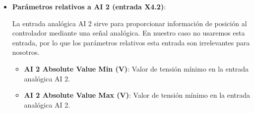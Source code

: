 \documentclass[english,spanish,a4paper,11pt]{article}
\begin{document}
\begin{itemize}
    \begin{itemize}
        \item $f_{\text{ZV}}(\cdot)$, correspondiente al parámetro «AI 1 Dead Band Zero Value» y mostrada en la \cref{fig:deadband_zv}.
        \item $f_{\text{IS}}(\cdot)$, correspondiente al parámetro «AI 1 Dead Band Input Signal» y mostrada en la \cref{fig:deadband_is}.
    \end{itemize}
    
    de forma que para el valor analógico de entrada $x$ la posición o velocidad objetivo será:
    
    \begin{equation}
        y = (f_{\text{ZV}} \circ f_{\text{IS}})(x) = f_{\text{ZV}}(f_{\text{IS}}(x))
    \end{equation}

    \begin{admonition}{Nota}
        El cálculo de la posición o velocidad objetivo no está especificado en el manual del controlador (considerando la versión del manual 3.0.1, la más reciente a fecha de este documento) y se ha obtenido experimentalmente. El manual solo describe los parámetros «AI 1 Dead Band Zero Value» y «AI 1 Dead Band Input Signal» de manera textual, de forma similar a como se han descrito más arriba.
    \end{admonition}

    \begin{figure}[!ht]
        \centering
        
        \caption{Función de transferencia $f_{\text{ZV}}(\cdot)$.}
        \label{fig:deadband_zv}
    \end{figure}
    
    \begin{figure}[!ht]
        \centering
        
        \caption{Función de transferencia $f_{\text{IS}}(\cdot)$.}
        \label{fig:deadband_is}
    \end{figure}


    \item \textbf{Parámetros relativos a AI 2 (entrada X4.2)}:\hfill

    La entrada analógica AI 2 sirve para proporcionar información de posición al controlador mediante una señal analógica. En nuestro caso no usaremos esta entrada, por lo que los parámetros relativos esta entrada son irrelevantes para nosotros.
    
    \begin{itemize}
        \item \textbf{AI 2 Absolute Value Min (\unit{\V})}: Valor de tensión mínimo en la entrada analógica AI 2.
  
        \item \textbf{AI 2 Absolute Value Max (\unit{\V})}: Valor de tensión mínimo en la entrada analógica AI 2.
    \end{itemize}
\end{itemize}
\end{document}

